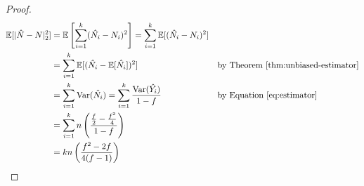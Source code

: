 \documentclass{article}
\begin{document}
\begin{enumerate}
\begin{proof}
	\begin{align*}
		\mathbb{E}[|\hat{N}-N|_2^2] &= \mathbb{E}\left[\sum\limits_{i=1}^k(\hat{N_i}-N_i)^2\right] = \sum\limits_{i=1}^k\mathbb{E}[(\hat{N_i}-N_i)^2] &&\\
			&= \sum\limits_{i=1}^k\mathbb{E}[(\hat{N_i}-\mathbb{E}[\hat{N_i}])^2] && \text{by Theorem~\ref{thm:unbiased-estimator}}\\
			&= \sum\limits_{i=1}^k\text{Var}(\hat{N_i}) = \sum\limits_{i=1}^k\frac{\text{Var}(\hat{Y_i})}{1-f}&&\text{by Equation~\ref{eq:estimator}}\\
			&= \sum\limits_{i=1}^kn\left(\frac{\frac{f}{2}-\frac{f^2}{4}}{1-f}\right) &&\\
			&= kn\left(\frac{f^2-2f}{4(f-1)}\right)
	\end{align*}
	
\end{proof}
\end{enumerate}



\end{document}
